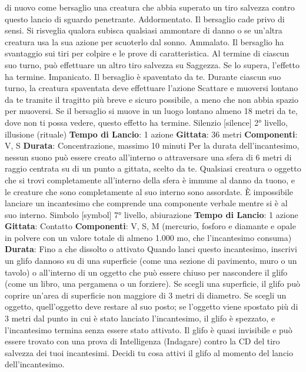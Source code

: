 \begin{multicols}{2}
di nuovo come bersaglio una creatura che abbia
superato un tiro salvezza contro questo lancio di
sguardo penetrante.
Addormentato. Il bersaglio cade privo di sensi. Si
risveglia qualora subisca qualsiasi ammontare di danno
o se un’altra creatura usa la sua azione per scuoterlo
dal sonno.
Ammalato. Il bersaglio ha svantaggio sui tiri per colpire
e le prove di caratteristica. Al termine di ciascun suo
turno, può effettuare un altro tiro salvezza su Saggezza.
Se lo supera, l’effetto ha termine.
Impanicato. Il bersaglio è spaventato da te. Durante
ciascun suo turno, la creatura spaventata deve
effettuare l’azione Scattare e muoversi lontano da te
tramite il tragitto più breve e sicuro possibile, a meno
che non abbia spazio per muoversi. Se il bersaglio si
muove in un luogo lontano almeno 18 metri da te, dove
non ti possa vedere, questo effetto ha termine.
Silenzio
[silence]
2° livello, illusione (rituale)
\textbf{Tempo di Lancio}: 1 azione
\textbf{Gittata}: 36 metri
\textbf{Componenti}: V, S
\textbf{Durata}: Concentrazione, massimo 10 minuti
Per la durata dell’incantesimo, nessun suono può
essere creato all’interno o attraversare una sfera di 6
metri di raggio centrata su di un punto a gittata, scelto
da te. Qualsiasi creatura o oggetto che si trovi
completamente all’interno della sfera è immune al
danno da tuono, e le creature che sono completamente
al suo interno sono assordate. È impossibile lanciare un
incantesimo che comprende una componente verbale
mentre si è al suo interno.
Simbolo
[symbol]
7° livello, abiurazione
\textbf{Tempo di Lancio}: 1 azione
\textbf{Gittata}: Contatto
\textbf{Componenti}: V, S, M (mercurio, fosforo e diamante e
opale in polvere con un valore totale di almeno 1.000
mo, che l’incantesimo consuma)
\textbf{Durata}: Fino a che dissolto o attivato
Quando lanci questo incantesimo, inscrivi un glifo
dannoso su di una superficie (come una sezione di
pavimento, muro o un tavolo) o all’interno di un oggetto
che può essere chiuso per nascondere il glifo (come un
libro, una pergamena o un forziere). Se scegli una
superficie, il glifo può coprire un’area di superficie non
maggiore di 3 metri di diametro. Se scegli un oggetto,
quell’oggetto deve restare al suo posto; se l’oggetto 
viene spostato più di 3 metri dal punto in cui è stato
lanciato l’incantesimo, il glifo è spezzato, e
l’incantesimo termina senza essere stato attivato.
Il glifo è quasi invisibile e può essere trovato con una
prova di Intelligenza (Indagare) contro la CD del tiro
salvezza dei tuoi incantesimi.
Decidi tu cosa attivi il glifo al momento del lancio
dell’incantesimo.

\end{multicols}
